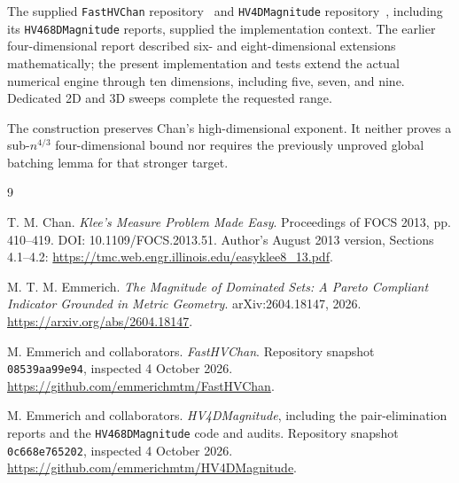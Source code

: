 \documentclass[12pt,a4paper]{article}
\newcommand{\1}{\mathbf1}
\begin{document}
The supplied \texttt{FastHVChan} repository~\cite{fastrepo} and
\texttt{HV4DMagnitude} repository~\cite{magrepo}, including its
\texttt{HV468DMagnitude} reports, supplied the implementation context.
The earlier four-dimensional report described six- and eight-dimensional
extensions mathematically; the present implementation and tests extend
the actual numerical engine through ten dimensions, including five,
seven, and nine. Dedicated 2D and 3D sweeps complete the requested range.

The construction preserves Chan's high-dimensional exponent. It neither
proves a sub-$n^{4/3}$ four-dimensional bound nor requires the previously
unproved global batching lemma for that stronger target.

\begin{thebibliography}{9}
\raggedright
{}
T. M. Chan. \emph{Klee's Measure Problem Made Easy}.
Proceedings of FOCS 2013, pp. 410--419. DOI: 10.1109/FOCS.2013.51.
Author's August 2013 version, Sections 4.1--4.2:
\url{https://tmc.web.engr.illinois.edu/easyklee8_13.pdf}.

M. T. M. Emmerich. \emph{The Magnitude of Dominated Sets: A Pareto Compliant
Indicator Grounded in Metric Geometry}. arXiv:2604.18147, 2026.
\url{https://arxiv.org/abs/2604.18147}.

M. Emmerich and collaborators. \emph{FastHVChan}.
Repository snapshot \texttt{08539aa99e94}, inspected 4 October 2026.
\url{https://github.com/emmerichmtm/FastHVChan}.

M. Emmerich and collaborators. \emph{HV4DMagnitude}, including the
pair-elimination reports and the \texttt{HV468DMagnitude} code and audits.
Repository snapshot \texttt{0c668e765202}, inspected 4 October 2026.
\url{https://github.com/emmerichmtm/HV4DMagnitude}.
\end{thebibliography}
\end{document}
